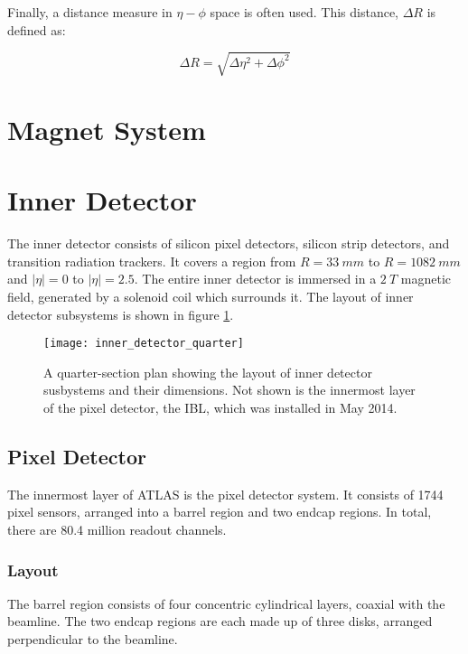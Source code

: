 Finally, a distance measure in $\eta-\phi$ space is often used. This
distance, $\Delta R$ is defined as:

\begin{equation}
\Delta R = \sqrt{\Delta\eta^2+\Delta\phi^2}
\end{equation}

\section{Magnet System}

\section{Inner Detector}

The inner detector consists of silicon pixel detectors, silicon strip
detectors, and transition radiation trackers. It covers a region from
$R = 33~mm$ to $R = 1082~mm$ and $|\eta| = 0$ to $|\eta| = 2.5$. The entire inner
detector is immersed in a $2~T$ magnetic field, generated by a
solenoid coil which surrounds it.\cite{atlas-detector-2008} The layout of inner detector
subsystems is shown in figure \ref{fig:inner_detector_quarter}.

\begin{figure}[h]
\texttt{[image: inner\_detector\_quarter]}
\caption{A quarter-section plan showing the layout of inner detector
  susbystems and their dimensions. Not shown is the innermost layer of
the pixel detector, the IBL, which was installed in May 2014.}
\label{fig:inner_detector_quarter}
\end{figure}

\subsection{Pixel Detector}

The innermost layer of ATLAS is the pixel detector system. It consists
of 1744 pixel sensors, arranged into a barrel region and two endcap
regions. In total, there are 80.4 million readout channels. \cite{atlas-detector-2008}

\subsubsection{Layout}
The barrel region consists of four
concentric cylindrical layers, coaxial with the beamline. The two endcap regions are each made up
of three disks, arranged perpendicular to the beamline.

